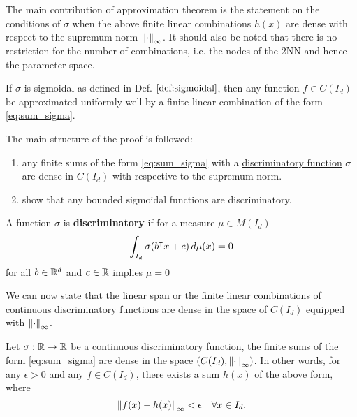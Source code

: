 The main contribution of approximation theorem is the statement on the
conditions of $\sigma$ when the above finite linear combinations $h(x)$ are
dense with respect to the supremum norm $\left\| \cdot \right\|_{\infty}$. It should also
be noted that there is no restriction for the number of combinations, i.e. the
nodes of the 2NN and hence the parameter space.

\begin{theorem}
    \label{thm:uat}
    If $\sigma$ is sigmoidal as defined in Def. $\ref{def:sigmoidal}$, then any
    function $f \in C(I_d)$ be approximated uniformly well by a finite linear
    combination of the form \eqref{eq:sum_sigma}.
\end{theorem}


The main structure of the proof is followed:
\begin{enumerate}
    \item any finite sums of the form \eqref{eq:sum_sigma} with a
    \hyperref[def:dis_func]{discriminatory function} $\sigma$ are dense in
    $C(I_d)$ with respective to the supremum norm.
    \item show that any bounded sigmoidal functions are discriminatory.
\end{enumerate}

\begin{definition}
    \label{def:dis_func}
    A function $\sigma$ is \textbf{discriminatory} if for a measure $\mu \in
    M(I_d)$
    \begin{equation}
        \int_{I_d} \sigma(b{}^{\intercal} x + c) \,d\mu(x) = 0
    \end{equation}
    for all $b \in \mathbb{R}^d$ and $c \in \mathbb{R}$ implies $\mu = 0$
\end{definition}

We can now state that the linear span or the finite linear combinations of
continuous discriminatory functions are dense in the space of $C(I_d)$ equipped
with $\left\| \cdot \right\|_{\infty}$.

\begin{theorem}
    Let $\sigma: \mathbb{R} \to \mathbb{R}$ be a
    continuous \hyperref[def:dis_func]{discriminatory function}, the finite sums
    of the form \eqref{eq:sum_sigma} are dense in the space $(C(I_d),
    \left\| \cdot \right\|_{\infty})$. In other words, for any $\epsilon > 0$ and any
    $f \in C(I_d)$, there exists a sum $h(x)$ of the above form, where
    \begin{equation}
        \left\| f(x) - h(x) \right\|_{\infty} < \epsilon \quad \forall x \in I_d.
    \end{equation}
\end{theorem}

